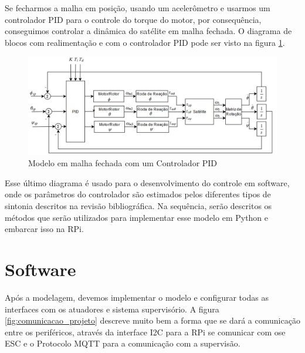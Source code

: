 Se fecharmos a malha em posição, usando um acelerômetro e usarmos um controlador PID para o controle do torque do motor, por consequência, conseguimos controlar a dinâmica do satélite em malha fechada. O diagrama de blocos com realimentação e com o controlador PID pode ser visto na figura \ref{fig:modelo_satelite_pid}. 

\begin{figure}[H]
  \caption{Modelo em malha fechada com um Controlador PID}
  \begin{center}
      \includegraphics[scale=.58]{img/modelo_satelite_pid}
  \end{center}
  \label{fig:modelo_satelite_pid}
\end{figure}

Esse último diagrama é usado para o desenvolvimento do controle em software, onde os parâmetros do controlador são estimados pelos diferentes tipos de sintonia descritos na revisão bibliográfica. Na sequência, serão descritos os métodos que serão utilizados para implementar esse modelo em Python e embarcar isso na RPi.


\section{Software}

Após a modelagem, devemos implementar o modelo e configurar todas as interfaces com os atuadores e sistema supervisório. A figura \ref{fig:comunicacao_projeto} descreve muito bem a forma que se dará a comunicação entre os periféricos, através da interface I2C para a RPi se comunicar com ose ESC e o Protocolo MQTT para a comunicação com a supervisão.


